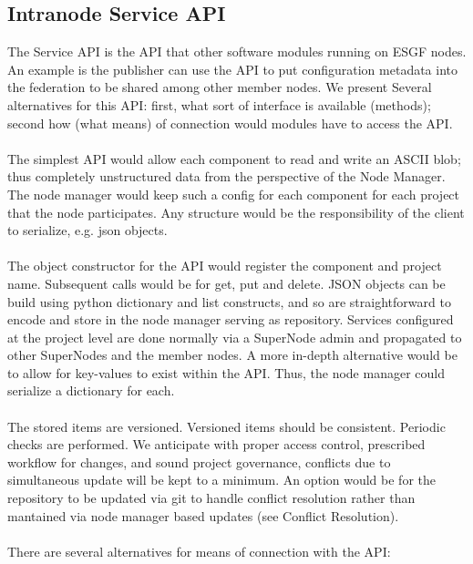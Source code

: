 \documentclass[oneside,12pt]{memoir}
\begin{document}
\subsection{Intranode Service API}

The Service API is the API that other software modules running on ESGF nodes.  An example is the publisher can use the API to put configuration metadata into the federation to be shared among other member nodes.  We present Several alternatives for this API: first, what sort of interface is available (methods); second how (what means) of connection would modules have to access the API.\\
\\
 The simplest API would allow each component to read and write an ASCII blob; thus completely unstructured data from the perspective of the Node Manager.  The node manager would keep such a config for each component for each project that the node participates.   Any structure would be the responsibility of the client to serialize, e.g. json objects.  \\
 \\
   The object constructor for the API would register the component and project name.  Subsequent calls would be for get, put and delete. 
    JSON objects can be build using python dictionary and list constructs, and so are straightforward to encode and store in the node manager serving as repository.   Services configured at the project level are done normally via a SuperNode admin and propagated to other SuperNodes and the member nodes.  A more in-depth alternative would be to allow for key-values to exist within the API.  Thus, the node manager could serialize a dictionary for each.\\
\\
The stored items are versioned.  Versioned items should be consistent.  Periodic checks are performed.  We anticipate with proper access control, prescribed workflow for changes, and sound project governance, conflicts due to simultaneous update will be kept to a minimum.  An option would be for the repository to be updated via git to handle conflict resolution rather than mantained via node manager based updates (see Conflict Resolution).\\
\\
There are several alternatives for means of connection with the API:
\end{document}

